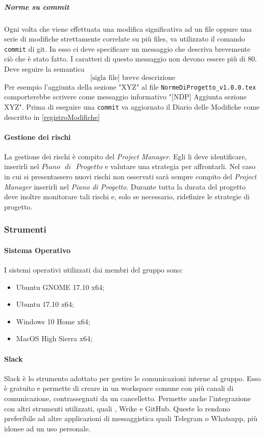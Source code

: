 \subparagraph{Norme su commit}\Spazio
Ogni volta che viene effettuata una modifica significativa ad un file oppure una serie di modifiche strettamente correlate su più files, va utilizzato il comando \texttt{commit} di git. In esso ci deve specificare un messaggio che descriva brevemente ciò che è stato fatto. I caratteri di questo messaggio non devono essere più di 80. Deve seguire la semantica
$$\text{[sigla file] breve descrizione}$$
Per esempio l'aggiunta della sezione "XYZ" al file \texttt{NormeDiProgetto\_v1.0.0.tex} comporterebbe scrivere come messaggio informativo "[NDP] Aggiunta sezione XYZ". Prima di eseguire una \texttt{commit} va aggiornato il Diario delle Modifiche come descritto in \ref{registroModifiche}

\paragraph{Gestione dei rischi} \Spazio
La gestione dei rischi è compito del \emph{Project Manager}. Egli li deve identificare, inserirli nel $Piano\text{ }di\text{ }Progetto$ e valutare una strategia per affrontarli. Nel caso in cui si presentassero nuovi rischi non osservati sarà sempre compito del \emph{Project Manager} inserirli nel \emph{Piano di Progetto}. Durante tutta la durata del progetto deve inoltre monitorare tali rischi e, solo se necessario, ridefinire le strategie di progetto.

\subsubsection{Strumenti}

\paragraph{Sistema Operativo} \Spazio
I sistemi operativi utilizzati dai membri del gruppo sono:
\begin{itemize}
	\item Ubuntu GNOME 17.10 x64;
	\item Ubuntu 17.10 x64;
	\item Windows 10 Home x64;
	\item MacOS High Sierra x64;
\end{itemize}

\paragraph{Slack}\Spazio
Slack è lo strumento adottato per gestire le comunicazioni interne al gruppo. Esso è gratuito e permette di creare in un workspace comune con più canali di comunicazione, contrassegnati da un cancelletto. Permette anche l'integrazione con altri strumenti utilizzati, quali , Wrike e GitHub. Queste  lo rendono preferibile ad altre applicazioni di messaggistica quali Telegram o Whatsapp, più idonee ad un uso personale.

